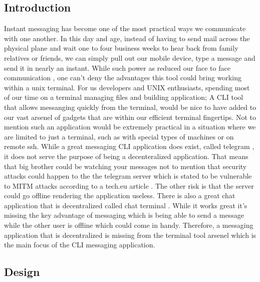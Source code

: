 \documentclass[twoside]{article}
\begin{document}
\begin{multicols}{2} %

\subsection{Introduction}

\lettrine[nindent=0em,lines=3]{I}{}nstant messaging has become one of the most practical ways we communicate with one another. In this day and age, instead of having to send mail across the physical plane and
wait one to four business weeks to hear back from family relatives or friends, we can simply pull out our mobile device, type a 
message and send it in nearly an instant. While such power as reduced our face to face communication \cite{hemmer}, one can't deny the
advantages this tool could bring working within a unix terminal. For us developers and
UNIX enthusiasts, spending most of our time on a terminal managing files and building application; A CLI tool that allows messanging quickly from the 
terminal, would be nice to have added to our vast arsenel of gadgets that are within 
our efficient terminal fingertips. Not to mention such an application would be extremely practical in a situation where we are limited 
to just a terminal, such as with special types of machines or on remote ssh. While a great messaging CLI application does exist, 
called telegram \cite{telegram}, it does not serve the purpose of being a decenteralized application. That means that big brother 
could be watching your messages not to mention that security attacks could happen to the the telegram server which is stated to be 
vulnerable to MITM attacks according to a tech.eu article \cite{wauters}. The other risk is that the server could go offline 
rendering the application useless. There is also a great chat application that is decentralized called chat terminal \cite{lanchat}. 
While it works great it's missing the key advantage of messaging which is being able to send a message while the other user is 
offline which could come in handy. Therefore,
a messaging application that is decentralized is missing from the terminal tool arsenel which is the main focus of the CLI messaging 
application. 


\subsection{Design}


\end{multicols}
\end{document}
